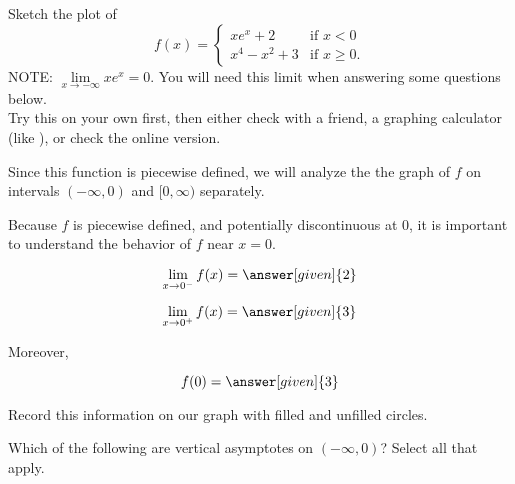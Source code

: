 \documentclass[wordchoicegiven]{ximera}
\begin{document}
\begin{example}
Sketch the plot of 
\[
f(x) = \begin{cases} xe^x+2 &\text{if $x<0$} \\
x^4-x^2+3 &\text{if $x \geq 0$}.
\end{cases}
\]
NOTE: $\lim\limits_{x \to -\infty}xe^x=0$. You will need this limit when answering some questions below.\\
 Try this on your own first, then either check with a friend, a graphing calculator (like ), or check the online version.


	Since this function is piecewise defined, we will analyze the the graph of $f$ on intervals $(-\infty,0)$ and $[0,\infty)$ separately.

	Because $f$ is piecewise defined, and potentially discontinuous at $0$, it is important to understand the behavior of $f$ near $x = 0$.
	
	\[
		\lim_{x \to 0^-} f(x) = \answer[given]{2}
	\]
	
	\[
		\lim_{x \to 0^+} f(x) = \answer[given]{3}
	\]
	
	Moreover, 
	
	\[
	f(0) = \answer[given]{3}
	\]
	
	Record this information on our graph with filled and unfilled circles.

	\begin{image}
\end{image}
	
Which of the following are vertical asymptotes on $(-\infty,0)$?  Select all that apply.

\begin{selectAll}
\end{selectAll}


\end{example}
\end{document}
